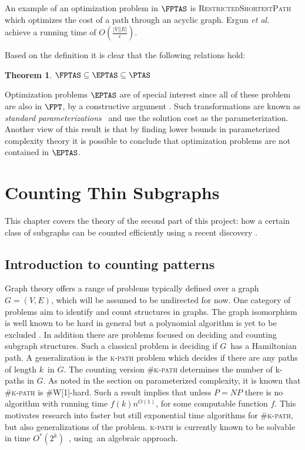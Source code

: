 \documentclass[a4paper,11pt]{report}
\theoremstyle{plain}
\newtheorem{thm}{Theorem}[chapter] %
\theoremstyle{definition}
\begin{document}
An example of an optimization problem in $\FPTAS$ is \textsc{RestrictedShortestPath} which optimizes the cost of a path through an acyclic graph.
Ergun \emph{et al.}~\cite{ergun02} achieve a running time of $O(\frac{|V| |E|}{\epsilon})$.

Based on the definition it is clear that the following relations hold:

\begin{thm}
$\FPTAS \subseteq \EPTAS \subseteq \PTAS$
\end{thm}

Optimization problems $\EPTAS$ are of special interest since all of these problem are also in $\FPT$, by a constructive argument \cite{FG06}.
Such transformations are known as \emph{standard parameterizations} \cite{FG06} and use the solution cost as the parameterization.
Another view of this result is that by finding lower bounds in parameterized complexity theory it is possible to conclude that optimization problems are not contained in $\EPTAS$.


\chapter{Counting Thin Subgraphs}
This chapter covers the theory of the second part of this project: how a certain class of subgraphs can be counted efficiently using a recent discovery \cite{BHKK13}.

\section{Introduction to counting patterns}
Graph theory offers a range of problems typically defined over a graph $G = (V, E)$, which will be assumed to be undirected for now.
One category of problems aim to identify and count structures in graphs.
The graph isomorphism is well known to be hard in general but a polynomial algorithm is yet to be excluded \cite{KOBLER94}.
In addition there are problems focused on deciding and counting subgraph structures.
Such a classical problem is deciding if $G$ has a Hamiltonian path.
A generalization is the \textsc{k-path} problem which decides if there are any paths of length $k$ in $G$.
The counting version \textsc{\#k-path} determines the number of k-paths in $G$.
As noted in the section on parameterized complexity, it is known that \textsc{\#k-path} is \textsc{\#W[1]}-hard.
Such a result implies that unless $P=NP$ there is no algorithm with running time $f(k)n^{O(1)}$, for some computable function $f$.
This motivates research into faster but still exponential time algorithms for \textsc{\#k-path}, but also generalizations of the problem.
\textsc{k-path} is currently known to be solvable in time $O^*(2^k)$ \cite{W09}, using an algebraic approach.
\end{document}
